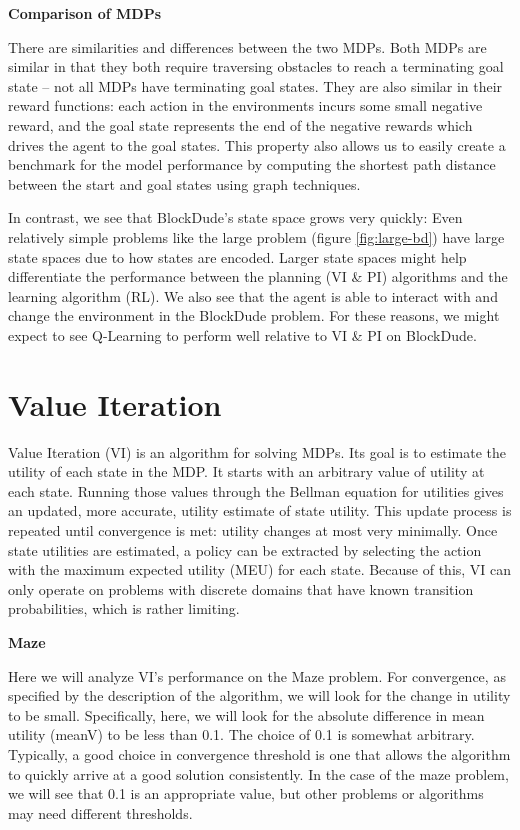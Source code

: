 \documentclass{article}
\begin{document}
\textbf{Comparison of MDPs}

There are similarities and differences between the two MDPs. Both MDPs are similar in that
they both require traversing obstacles to reach a terminating goal state -- not all MDPs
have terminating goal states. They are also similar in their reward functions: each
action in the environments incurs some small negative reward, and the goal state represents
the end of the negative rewards which drives the agent to the goal states. This property
also allows us to easily create a benchmark for the model performance by computing the
shortest path distance between the start and goal states using graph techniques.

In contrast, we see that BlockDude's state space grows very quickly:
Even relatively simple problems like the large problem (figure \ref{fig:large-bd}) have large
state spaces due to how states are encoded. Larger state spaces might help differentiate the
performance between the planning (VI \& PI) algorithms and the learning algorithm (RL). We
also see that the agent is able to interact with and change the environment in the
BlockDude problem. For these reasons, we might expect to see Q-Learning to perform
well relative to VI \& PI on BlockDude.



\section{Value Iteration} \label{VI}

Value Iteration (VI) is an algorithm for solving MDPs. Its goal is to estimate the utility of
each state in the MDP. It starts with an arbitrary value of utility at each state. Running those
values through the Bellman equation for utilities gives an updated, more accurate, utility
estimate of state utility. This update process is repeated until convergence is met: utility
changes at most very minimally. Once state utilities are estimated, a policy can be extracted
by selecting the action with the maximum expected utility (MEU) for each state. Because of this,
VI can only operate on problems with discrete domains that have known transition probabilities,
which is rather limiting.

\textbf{Maze}

Here we will analyze VI's performance on the Maze problem. For convergence, as specified by the
description of the algorithm, we will look for the change in utility to be small. Specifically,
here, we will look for the absolute difference in mean utility (meanV) to be less than 0.1. The
choice of 0.1 is somewhat arbitrary. Typically, a good choice in convergence threshold is one
that allows the algorithm to quickly arrive at a good solution consistently. In the case of the
maze problem, we will see that 0.1 is an appropriate value, but other problems or algorithms
may need different thresholds.
\end{document}
